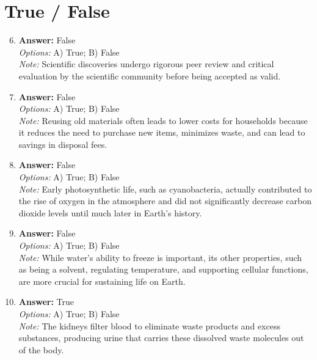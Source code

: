 \documentclass[12pt]{article}
\begin{document}
\section*{True / False}
\begin{enumerate}[label=\arabic*.]
\setcounter{enumi}{5}
\item \textbf{Answer:} False
\\ \textit{Options:} A) True; B) False
\\ \textit{Note:} Scientific discoveries undergo rigorous peer review and critical evaluation by the scientific community before being accepted as valid.
\item \textbf{Answer:} False
\\ \textit{Options:} A) True; B) False
\\ \textit{Note:} Reusing old materials often leads to lower costs for households because it reduces the need to purchase new items, minimizes waste, and can lead to savings in disposal fees.
\item \textbf{Answer:} False
\\ \textit{Options:} A) True; B) False
\\ \textit{Note:} Early photosynthetic life, such as cyanobacteria, actually contributed to the rise of oxygen in the atmosphere and did not significantly decrease carbon dioxide levels until much later in Earth's history.
\item \textbf{Answer:} False
\\ \textit{Options:} A) True; B) False
\\ \textit{Note:} While water's ability to freeze is important, its other properties, such as being a solvent, regulating temperature, and supporting cellular functions, are more crucial for sustaining life on Earth.
\item \textbf{Answer:} True
\\ \textit{Options:} A) True; B) False
\\ \textit{Note:} The kidneys filter blood to eliminate waste products and excess substances, producing urine that carries these dissolved waste molecules out of the body.
\end{enumerate}
\end{document}

